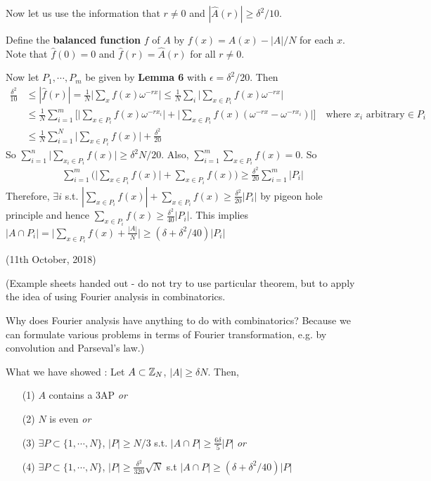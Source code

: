\documentclass[10pt,a4paper]{report}
\renewcommand{\hat}{\widehat}
\begin{document}
Now let us use the  information that $r\neq 0$ and $|\hat{A}(r) | \geq \delta^2/10$.

Define the \textbf{balanced function} $f$ of $A$ by $f(x) = A(x) - |A|/N$ for each $x$. Note that $\hat{f}(0) =0 $ and $\hat{f}(r) = \hat{A}(r)$ for all $r\neq 0$.

Now let $P_1, \cdots, P_m$ be given by \textbf{Lemma 6} with $\epsilon = \delta^2/20$. Then
\begin{align*}
\frac{\delta^2}{10} &\leq |\hat{f}(r)| = \frac{1}{N} \big| \sum_x f(x) \omega^{-rx} \big| \leq \frac{1}{N} \sum_i \big| \sum_{x\in P_i}  f(x) \omega^{-rx} \big | \\
&\leq \frac{1}{N} \sum_{i=1}^m \Big[ \big| \sum_{x\in P_i} f(x) \omega^{-rx_i} \big| + \big| \sum_{x\in P_i} f(x)(\omega^{-rx} - \omega^{-rx_i})   \big|     \Big] \quad \text{where } x_i \text{ arbitrary} \in P_i \\
&\leq \frac{1}{N} \sum_{i=1}^N \big| \sum_{x\in P_i} f(x) \big| + \frac{\delta^2}{20}
\end{align*}
So $\sum_{i=1}^n \big| \sum_{x_i\in P_i} f(x) \big| \geq \delta^2 N/20$. Also, $\sum_{i=1}^m \sum_{x\in P_i} f(x) =0$. So
\begin{align*}
\sum_{i=1}^m \Big(  \big| \sum_{x\in P_i} f(x) \big| + \sum_{x\in P_i}f(x) \Big) \geq \frac{\delta^2}{20} \sum_{i=1}^m |P_i|
\end{align*}
Therefore, $\exists i$ s.t. $|\sum_{x\in P_i} f(x) | + \sum_{x\in P_i}f(x) \geq \frac{\delta^2}{20} |P_i|$ by pigeon hole principle and hence $\sum_{x\in P_i}f(x) \geq \frac{\delta^2}{40}|P_i|$. This implies $|A\cap P_i | = \big| \sum_{x\in P_i} f(x) + \frac{|A|}{N}  \big|   \geq (\delta + \delta^2/40)|P_i|$
\s

\newday

(11th October, 2018)
\s

(Example sheets handed out - do not try to use particular theorem, but to apply the idea of using Fourier analysis in combinatorics.

Why does Fourier analysis have anything to do with combinatorics? Because we can formulate various problems in terms of Fourier transformation, e.g. by convolution and Parseval's law.)
\s

\bull What we have showed : Let $A \subset \mathbb{Z}_N$, $|A|\geq \delta N$. Then,
\begin{itemize}
\item[(1)] $A$ contains a 3AP \emph{or}
\item[(2)] $N$ is even \emph{or}
\item[(3)] $\exists P \subset \{ 1,\cdots, N\}$, $|P|\geq N/3$ s.t. $|A\cap P| \geq \frac{6\delta}{5} |P|$ \emph{or}
\item[(4)] $\exists P \subset \{1,\cdots, N\}$, $|P| \geq \frac{\delta^2}{320} \sqrt{N}$ s.t $|A\cap P| \geq (\delta + \delta^2/40)|P|$
\end{itemize}
\end{document}
